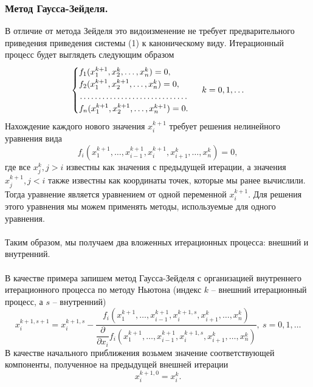 \documentclass[a4paper, 12pt]{report}
\numberwithin{equation}{section}
\begin{document}
\subsubsection{Метод Гаусса-Зейделя.}
В отличие от метода Зейделя это видоизменение не требует предварительного приведения приведения системы (1) к каноническому виду. Итерационный процесс будет выглядеть следующим образом 
\begin{equation}
	\begin{cases}
	f_1(x_1^{k+1},x_2^k,\ldots,x_n^k) = 0,\\
	f_2(x_1^{k+1},x_2^{k+1},\ldots,x_n^k) = 0,\\
	\dotfill\\
	f_n(x_1^{k+1},x_2^{k+1},\ldots,x_n^{k+1}) = 0.
\end{cases}\ k=0,1,\ldots
\end{equation}
Нахождение каждого нового значения $x_i^{k+1}$ требует решения нелинейного уравнения вида $$f_i(x_1^{k+1},\ldots, x_{i-1}^{k+1}, x_i^{k+1}, x_{i+1}^k, \ldots, x_n^k) = 0,$$
где все $x_j^k, j>i$ известны как значения с предыдущей итерации, а значения $x_j^{k+1}, j<i$ также известны как координаты точек, которые мы ранее вычислили. Тогда уравнение является уравнением от одной переменной $x_i^{k+1}$. Для решения этого уравнения мы можем применять методы, используемые для одного уравнения.\\\\
Таким образом, мы получаем два вложенных итерационных процесса: внешний и внутренний.\\\\
В качестве примера запишем метод Гаусса-Зейделя с организацией внутреннего итерационного процесса по методу Ньютона (индекс $k$ -- внешний итерационный процесс, а $s$ -- внутренний)
\begin{equation}
	x_i^{k+1, s+1} = x_i^{k+1, s} - \dfrac{f_i(x_1^{k+1},\ldots, x_{i-1}^{k+1}, x_i^{k+1, s}, x_{i+1}^k, \ldots, x_n^k)}{\dfrac{\partial}{\partial x_i} f_i(x_1^{k+1},\ldots, x_{i-1}^{k+1}, x_i^{k+1, s}, x_{i+1}^k, \ldots, x_n^k)},\ s = 0,1,\ldots
\end{equation}
В качестве начального приближения возьмем значение соответствующей компоненты, полученное на предыдущей внешней итерации $$x_i^{k+1, 0} = x_i^k.$$
\end{document}
